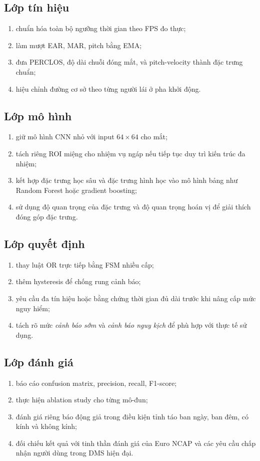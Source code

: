 \documentclass[12pt,a4paper]{article}
\begin{document}
\subsection{Lớp tín hiệu}
\begin{enumerate}[label=\arabic*.]
  \item chuẩn hóa toàn bộ ngưỡng thời gian theo FPS đo thực;
  \item làm mượt EAR, MAR, pitch bằng EMA;
  \item đưa PERCLOS, độ dài chuỗi đóng mắt, và pitch-velocity thành đặc trưng chuẩn;
  \item hiệu chỉnh đường cơ sở theo từng người lái ở pha khởi động.
\end{enumerate}

\subsection{Lớp mô hình}
\begin{enumerate}[label=\arabic*.]
  \item giữ mô hình CNN nhỏ với input \(64\times64\) cho mắt;
  \item tách riêng ROI miệng cho nhiệm vụ ngáp nếu tiếp tục duy trì kiến trúc đa nhiệm;
  \item kết hợp đặc trưng học sâu và đặc trưng hình học vào mô hình bảng như Random Forest hoặc gradient boosting;
  \item sử dụng độ quan trọng của đặc trưng và độ quan trọng hoán vị để giải thích đóng góp đặc trưng.
\end{enumerate}

\subsection{Lớp quyết định}
\begin{enumerate}[label=\arabic*.]
  \item thay luật OR trực tiếp bằng FSM nhiều cấp;
  \item thêm hysteresis để chống rung cảnh báo;
  \item yêu cầu đa tín hiệu hoặc bằng chứng thời gian đủ dài trước khi nâng cấp mức nguy hiểm;
  \item tách rõ mức \textit{cảnh báo sớm} và \textit{cảnh báo nguy kịch} để phù hợp với thực tế sử dụng.
\end{enumerate}

\subsection{Lớp đánh giá}
\begin{enumerate}[label=\arabic*.]
  \item báo cáo confusion matrix, precision, recall, F1-score;
  \item thực hiện ablation study cho từng mô-đun;
  \item đánh giá riêng báo động giả trong điều kiện tỉnh táo ban ngày, ban đêm, có kính và không kính;
  \item đối chiếu kết quả với tinh thần đánh giá của Euro NCAP và các yêu cầu chấp nhận người dùng trong DMS hiện đại.
\end{enumerate}
\end{document}
